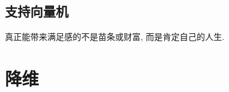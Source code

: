 \documentclass[lang=cn,10pt]{gorgeousnbook}
\numberwithin{equation}{section}%
\numberwithin{figure}{section}%
\begin{document}
\chapter{支持向量机}
\vspace{0.5in}
\begin{center}
    \textcolor[RGB]{255, 0, 0}{\faHeart}真正能带来满足感的不是苗条或财富, 而是肯定自己的人生.\textcolor[RGB]{255, 0, 0}{\faHeart}
\end{center}

\begin{center}
\end{center}





















%






\mainmatter
{}
\part{降维}
\end{document}
